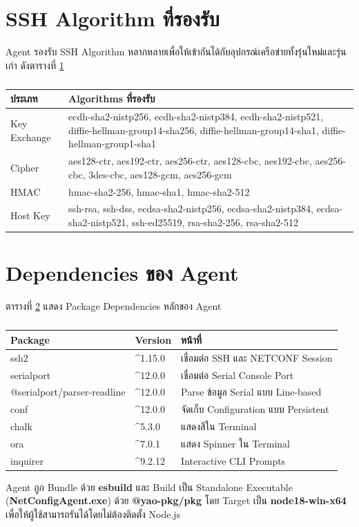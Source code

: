 \section{SSH Algorithm ที่รองรับ}
\hspace*{1.3em}
Agent รองรับ SSH Algorithm หลากหลายเพื่อให้เข้ากันได้กับอุปกรณ์เครือข่ายทั้งรุ่นใหม่และรุ่นเก่า ดังตารางที่ \ref{tabD2:SSHAlgorithms}

\begin{table}[H]
\centering
\caption{}
\label{tabD2:SSHAlgorithms}
\fontSixTeen
\begin{tabularx}{\textwidth}{|l|X|}
\hline
\textbf{ประเภท} & \textbf{Algorithms ที่รองรับ} \\
\hline
Key Exchange & ecdh-sha2-nistp256, ecdh-sha2-nistp384, ecdh-sha2-nistp521, diffie-hellman-group14-sha256, diffie-hellman-group14-sha1, diffie-hellman-group1-sha1 \\
\hline
Cipher & aes128-ctr, aes192-ctr, aes256-ctr, aes128-cbc, aes192-cbc, aes256-cbc, 3des-cbc, aes128-gcm, aes256-gcm \\
\hline
HMAC & hmac-sha2-256, hmac-sha1, hmac-sha2-512 \\
\hline
Host Key & ssh-rsa, ssh-dss, ecdsa-sha2-nistp256, ecdsa-sha2-nistp384, ecdsa-sha2-nistp521, ssh-ed25519, rsa-sha2-256, rsa-sha2-512 \\
\hline
\end{tabularx}
\end{table}

\section{Dependencies ของ Agent}
\hspace*{1.3em}
ตารางที่ \ref{tabD2:AgentDeps} แสดง Package Dependencies หลักของ Agent

\begin{table}[H]
\centering
\caption{}
\label{tabD2:AgentDeps}
\fontSixTeen
\begin{tabularx}{\textwidth}{|l|l|X|}
\hline
\textbf{Package} & \textbf{Version} & \textbf{หน้าที่} \\
\hline
ssh2 & \^{}1.15.0 & เชื่อมต่อ SSH และ NETCONF Session \\
\hline
serialport & \^{}12.0.0 & เชื่อมต่อ Serial Console Port \\
\hline
@serialport/parser-readline & \^{}12.0.0 & Parse ข้อมูล Serial แบบ Line-based \\
\hline
conf & \^{}12.0.0 & จัดเก็บ Configuration แบบ Persistent \\
\hline
chalk & \^{}5.3.0 & แสดงสีใน Terminal \\
\hline
ora & \^{}7.0.1 & แสดง Spinner ใน Terminal \\
\hline
inquirer & \^{}9.2.12 & Interactive CLI Prompts \\
\hline
\end{tabularx}
\end{table}

\hspace*{1.3em}
Agent ถูก Bundle ด้วย \textbf{esbuild} และ Build เป็น Standalone Executable (\textbf{NetConfigAgent.exe}) ด้วย \textbf{@yao-pkg/pkg} โดย Target เป็น \textbf{node18-win-x64} เพื่อให้ผู้ใช้สามารถรันได้โดยไม่ต้องติดตั้ง Node.js


